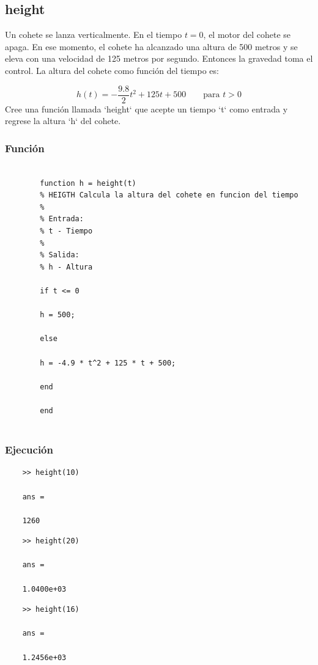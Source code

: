 \documentclass{article}
\begin{document}
	\newpage
	\subsection{height}
	
	Un cohete se lanza verticalmente. En el tiempo $t = 0$, el motor del cohete se apaga. En ese momento, el cohete ha alcanzado una altura de 500 metros y se eleva con una velocidad de 125 metros por segundo. Entonces la gravedad toma el control. La altura del cohete como función del tiempo es:
	
	$$h(t) = -\frac{9.8}{2}t^2 + 125t + 500 \qquad \text{para } t > 0$$
	\newline
	Cree una función llamada `height` que acepte un tiempo `t` como entrada y regrese la altura `h` del cohete.
	
	\subsubsection{Función}
	
	\begin{lstlisting}
		
		function h = height(t)
		% HEIGTH Calcula la altura del cohete en funcion del tiempo
		%
		% Entrada:
		% t - Tiempo
		%
		% Salida:
		% h - Altura
		
		if t <= 0
		
		h = 500;
		
		else
		
		h = -4.9 * t^2 + 125 * t + 500;
		
		end
		
		end
		
	\end{lstlisting}
	
	\subsubsection{Ejecución}
	
	\begin{lstlisting}
	>> height(10)
	
	ans =
	
	1260
	\end{lstlisting}
	
	\begin{lstlisting}
	>> height(20)
	
	ans =
	
	1.0400e+03
	\end{lstlisting}
	
	\begin{lstlisting}
	>> height(16)
	
	ans =
	
	1.2456e+03
	\end{lstlisting}
	
\end{document}
